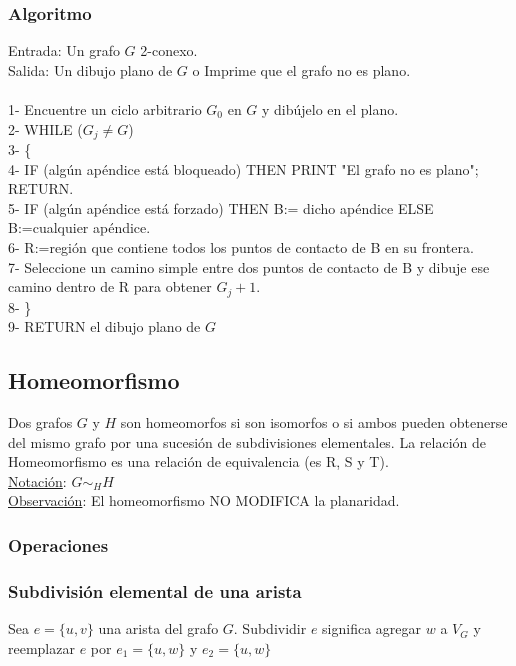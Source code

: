 \documentclass{article}
\begin{document}
\subsubsection*{Algoritmo}
Entrada: Un grafo $G$ 2-conexo.
\\Salida: Un dibujo plano de $G$ o Imprime que el grafo no es plano.
\\
\\1- Encuentre un ciclo arbitrario  $G_0$ en $G$ y dibújelo en el plano.
\\2- WHILE ($G_j \neq G$)
\\3- \{
\\4-   IF (algún apéndice está bloqueado) THEN PRINT "El grafo no es plano"; RETURN.
\\5-   IF (algún apéndice está forzado) THEN B:= dicho apéndice ELSE B:=cualquier apéndice.
\\6-   R:=región que contiene todos los puntos de contacto de B en su frontera.
\\7-   Seleccione un camino simple entre dos puntos de contacto de B y dibuje ese camino
    dentro de R para obtener $G_j + 1$.
\\8- \}
\\9- RETURN el dibujo plano de $G$

\subsection{Homeomorfismo}
Dos grafos $G$ y $H$ son homeomorfos si son isomorfos o si ambos pueden obtenerse del mismo grafo por una sucesión de subdivisiones elementales.
La relación de Homeomorfismo es una relación de equivalencia (es R, S y T).
\\\underline{Notación}: $G \sim_H H$
\\\underline{Observación}: El homeomorfismo NO MODIFICA la planaridad.

\subsubsection{Operaciones}
\subsubsection*{Subdivisión elemental de una arista}
Sea $e = \{u,v\}$ una arista del grafo $G$. Subdividir $e$ significa agregar $w$ a $V_G$ y reemplazar $e$ por $e_1 = \{u,w\}$ y $e_2 = \{u,w\}$
\end{document}
